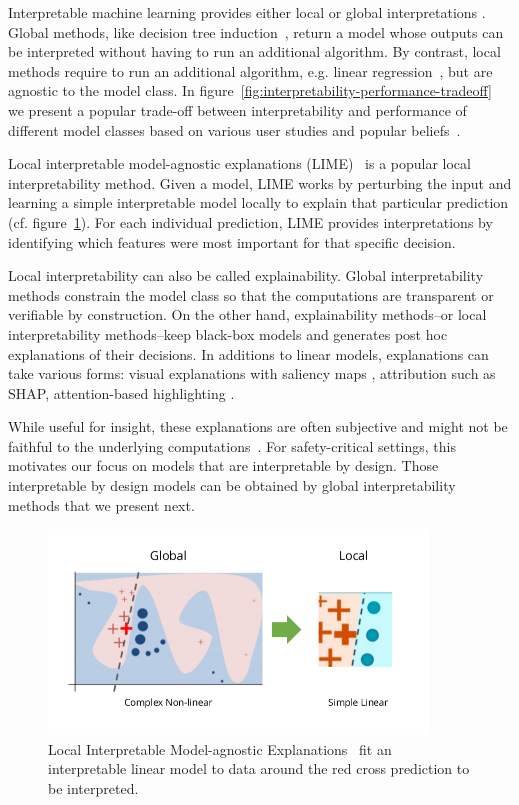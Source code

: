 Interpretable machine learning provides either local or global interpretations \cite{glanois-survey}.
Global methods, like decision tree induction~\cite{breiman1984classification}, return a model whose outputs can be interpreted without having to run an additional algorithm.
By contrast, local methods require to run an additional algorithm, e.g. linear regression~\cite{regression}, but are agnostic to the model class.
In figure~\ref{fig:interpretability-performance-tradeoff} we present a popular trade-off between interpretability and performance of different model classes based on various user studies and popular beliefs~\cite{study-0,study-1,study-2,study-3,study-4,study-5,study-6,study-7}.

Local interpretable model-agnostic explanations (LIME)~\cite{lime} is a popular local interpretability method.
Given a model, LIME works by perturbing the input and learning a simple interpretable model locally to explain that particular prediction (cf. figure~\ref{fig:lime}). 
For each individual prediction, LIME provides interpretations by identifying which features were most important for that specific decision.

Local interpretability can also be called explainability.
Global interpretability methods constrain the model class so that the computations are transparent or verifiable by construction. 
On the other hand, explainability methods--or local interpretability methods--keep black-box models and generates post hoc explanations of their decisions. 
In additions to linear models, explanations can take various forms: visual explanations with saliency maps \cite{Puri2020Explain}, attribution such as SHAP\cite{shap}, attention-based highlighting \cite{attention}.

While useful for insight, these explanations are often subjective and might not be faithful to the underlying computations~\cite{Atrey2020Exploratory}.
For safety-critical settings, this motivates our focus on models that are interpretable by design.
Those interpretable by design models can be obtained by global interpretability methods that we present next.

\begin{figure}
    \includegraphics[width=0.9\textwidth]{images/lime.png}
    \caption{Local Interpretable Model-agnostic Explanations~\cite{lime} fit an interpretable linear model to data around the red cross prediction to be interpreted.}\label{fig:lime}
\end{figure}


